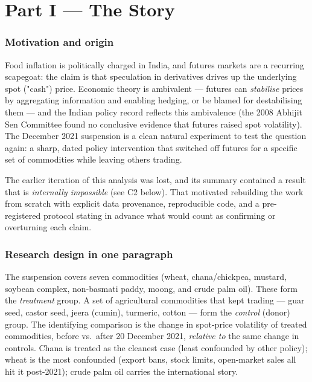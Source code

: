 \documentclass[11pt]{article}
\begin{document}
\part*{Part I --- The Story}

\section{Motivation and origin}
Food inflation is politically charged in India, and futures markets are a recurring
scapegoat: the claim is that speculation in derivatives drives up the underlying spot
("cash") price. Economic theory is ambivalent --- futures can \emph{stabilise} prices by
aggregating information and enabling hedging, or be blamed for destabilising them --- and
the Indian policy record reflects this ambivalence (the 2008 Abhijit Sen Committee found no
conclusive evidence that futures raised spot volatility). The December 2021 suspension is a
clean natural experiment to test the question again: a sharp, dated policy intervention that
switched off futures for a specific set of commodities while leaving others trading.

The earlier iteration of this analysis was lost, and its summary contained a result that is
\emph{internally impossible} (see C2 below). That motivated rebuilding the work from scratch
with explicit data provenance, reproducible code, and a pre-registered protocol stating in
advance what would count as confirming or overturning each claim.

\section{Research design in one paragraph}
The suspension covers seven commodities (wheat, chana/chickpea, mustard, soybean complex,
non-basmati paddy, moong, and crude palm oil). These form the \emph{treatment} group. A set
of agricultural commodities that kept trading --- guar seed, castor seed, jeera (cumin),
turmeric, cotton --- form the \emph{control} (donor) group. The identifying comparison is
the change in spot-price volatility of treated commodities, before vs.\ after 20 December
2021, \emph{relative to} the same change in controls. Chana is treated as the cleanest case
(least confounded by other policy); wheat is the most confounded (export bans, stock limits,
open-market sales all hit it post-2021); crude palm oil carries the international story.
\end{document}
